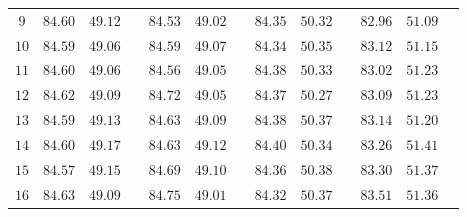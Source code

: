 \documentclass[conference]{IEEEtran}
\begin{document}
\begin{table}[h]
{\begin{tabular}{ccccccccccccc}
    $9$ & $84.60$ & $49.12$ && $84.53$ & $49.02$ &&$84.35$ & $50.32$ && $82.96$ & $51.09$\\
    $10$ & $84.59$ & $49.06$ && $84.59$ & $49.07$ &&$84.34$ & $50.35$ && $83.12$ & $51.15$\\
    $11$ & $84.60$ & $49.06$ && $84.56$ & $49.05$ &&$84.38$ & $50.33$ && $83.02$ & $51.23$\\
    $12$ & $84.62$ & $49.09$ && $84.72$ & $49.05$ &&$84.37$ & $50.27$ && $83.09$ & $51.23$\\
    $13$ & $84.59$ & $49.13$ && $84.63$ & $49.09$ &&$84.38$ & $50.37$ && $83.14$ & $51.20$\\
    $14$ & $84.60$ & $49.17$ && $84.63$ & $49.12$ &&$84.40$ & $50.34$ &&$83.26$ & $\mathbf{51.41}$\\
    $15$ & $84.57$ & $49.15$ && $84.69$ & $49.10$ &&$84.36$ & $\mathbf{50.38}$ && $83.30$ & $51.37$\\
    $16$ & $\mathbf{84.63}$ & $49.09$ && $\mathbf{84.75}$ & $49.01$ &&$84.32$ & $50.37$ && $83.51$ & $51.36$\\
    \bottomrule
    \end{tabular}
}
\end{table}

\begin{table}[h]
\footnotesize
\caption{Clean and PGD-50 \mbox{\cite{tdlmm18}} accuracy of various RobustBench-ranked models \mbox{\cite{rasca20}}, both before (Base) and after integration with the \sys technique (models tested here includes WideResNet-94-16 \mbox{\cite{arlbd24}} and RaWideResNet-70-16 \mbox{\cite{rpapx23}} over CIFAR-10 dataset, WideResNet-70-16 \mbox{\cite{bdmwp23}} over CIFAR-100 dataset and Swin-L \mbox{\cite{acsld24}} and ConvNeXt-L \mbox{\cite{acsld23}} over ImageNet}
\renewcommand{\arraystretch}{1.3}
\label{tab:attack_type}
\centering
{}
\end{table}
\end{document}
